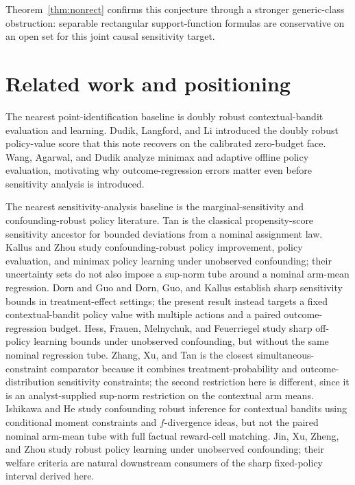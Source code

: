 \documentclass[11pt]{article}
\theoremstyle{definition}
\theoremstyle{plain}
\theoremstyle{remark}
\begin{document}
Theorem~\ref{thm:nonrect} confirms this conjecture through a stronger
generic-class obstruction: separable rectangular support-function formulas are
conservative on an open set for this joint causal sensitivity target.

\section{Related work and positioning}
The nearest point-identification baseline is doubly robust contextual-bandit
evaluation and learning.  Dudik, Langford, and Li \cite{DudikLangfordLi2011}
introduced the doubly robust policy-value score that this note recovers on the
calibrated zero-budget face.  Wang, Agarwal, and Dudik
\cite{WangAgarwalDudik2017} analyze minimax and adaptive offline policy
evaluation, motivating why outcome-regression errors matter even before
sensitivity analysis is introduced.

The nearest sensitivity-analysis baseline is the marginal-sensitivity and
confounding-robust policy literature.  Tan \cite{Tan2006} is the classical
propensity-score sensitivity ancestor for bounded deviations from a nominal
assignment law.  Kallus and Zhou \cite{KallusZhou2018,KallusZhou2020,KallusZhou2021}
study confounding-robust policy improvement, policy evaluation, and minimax
policy learning under unobserved confounding; their uncertainty sets do not
also impose a sup-norm tube around a nominal arm-mean regression.  Dorn and Guo
\cite{DornGuo2023} and Dorn, Guo, and Kallus \cite{DornGuoKallus2025}
establish sharp sensitivity bounds in treatment-effect settings; the present
result instead targets a fixed contextual-bandit policy value with multiple
actions and a paired outcome-regression budget.  Hess, Frauen, Melnychuk, and
Feuerriegel \cite{HessFrauenMelnychukFeuerriegel2026} study sharp off-policy
learning bounds under unobserved confounding, but without the same nominal
regression tube.  Zhang, Xu, and Tan \cite{ZhangXuTan2025} is the closest
simultaneous-constraint comparator because it combines treatment-probability
and outcome-distribution sensitivity constraints; the second restriction here
is different, since it is an analyst-supplied sup-norm restriction on the
contextual arm means.  Ishikawa and He \cite{IshikawaHe2023} study confounding
robust inference for contextual bandits using conditional moment constraints
and $f$-divergence ideas, but not the paired nominal arm-mean tube with full
factual reward-cell matching.  Jin, Xu, Zheng, and Zhou
\cite{JinXuZhengZhou2025} study robust policy learning under unobserved
confounding; their welfare criteria are natural downstream consumers of the
sharp fixed-policy interval derived here.
\end{document}
